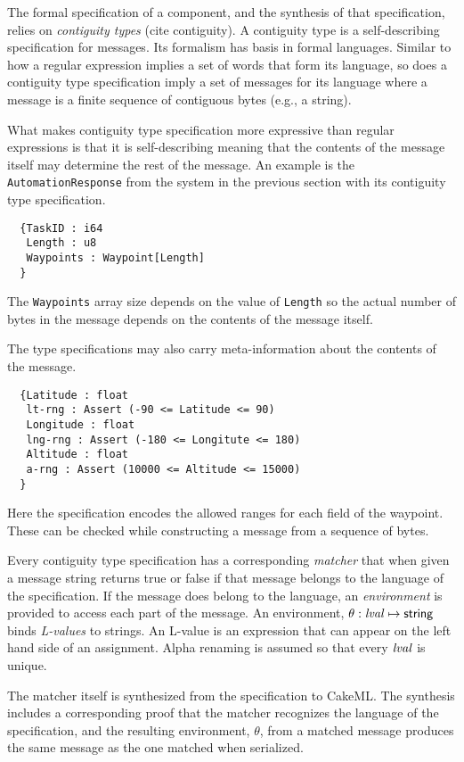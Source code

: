 The formal specification of a component, and the synthesis of that specification, relies on \emph{contiguity types} (cite contiguity). A contiguity type is a self-describing specification for messages. Its formalism has basis in formal languages. Similar to how a regular expression implies a set of words that form its language, so does a contiguity type specification imply a set of messages for its language where a message is a finite sequence of contiguous bytes (e.g., a string). 

What makes contiguity type specification more expressive than regular expressions is that it is self-describing meaning that the contents of the message itself may determine the rest of the message. An example is the \texttt{AutomationResponse} from the system in the previous section with its contiguity type specification.
{\small
\begin{verbatim}
  {TaskID : i64
   Length : u8
   Waypoints : Waypoint[Length]
  }
\end{verbatim}
}
\noindent The \texttt{Waypoints} array size depends on the value of \texttt{Length} so the actual number of bytes in the message depends on the contents of the message itself. 

The type specifications may also carry meta-information about the contents of the message.
{\small
\begin{verbatim}
  {Latitude : float
   lt-rng : Assert (-90 <= Latitude <= 90) 
   Longitude : float
   lng-rng : Assert (-180 <= Longitute <= 180)
   Altitude : float
   a-rng : Assert (10000 <= Altitude <= 15000)
  }
\end{verbatim}
}
\noindent Here the specification encodes the allowed ranges for each field of the waypoint. These can be checked while constructing a message from a sequence of bytes.

Every contiguity type specification has a corresponding \emph{matcher} that when given a message string returns true or false if that message belongs to the language of the specification. If the message does belong to the language, an \emph{environment} is provided to access each part of the message. An environment, $\theta: \mathit{lval} \mapsto \mathsf{string}$ binds \emph{L-values} to strings. An L-value is an expression that can appear on the left hand side of an assignment. Alpha renaming is assumed so that every $\mathit{lval}$ is unique.

The matcher itself is synthesized from the specification to CakeML. The synthesis includes a corresponding proof that the matcher recognizes the language of the specification, and the resulting environment, $\theta$, from a matched message produces the same message as the one matched when serialized.
